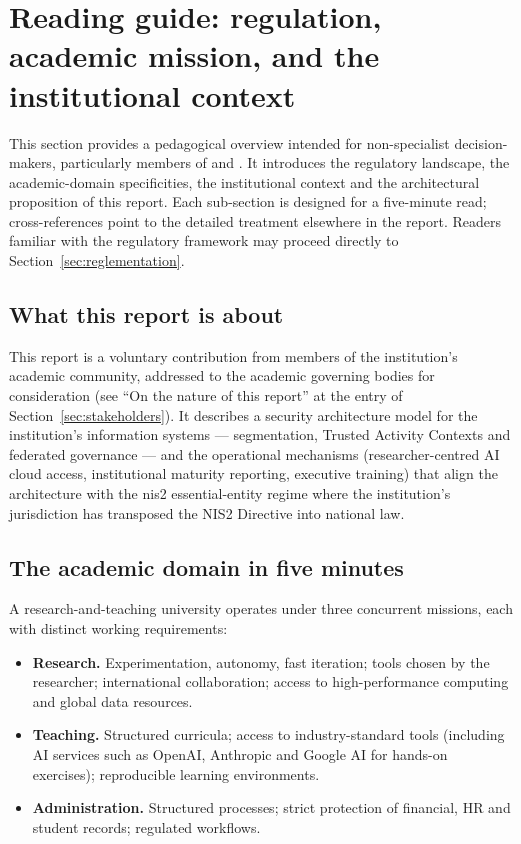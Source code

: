 \section{Reading guide: regulation, academic mission, and the institutional context}
\label{sec:reading-guide}

This section provides a pedagogical overview intended for
non-specialist decision-makers, particularly members of  and
. It introduces the regulatory
landscape, the academic-domain specificities, the institutional
context and the architectural proposition of this report. Each
sub-section is designed for a five-minute read; cross-references
point to the detailed treatment elsewhere in the report. Readers
familiar with the regulatory framework may proceed directly to
Section~\ref{sec:reglementation}.

\subsection{What this report is about}

This report is a voluntary contribution from members of the
institution's academic community, addressed to
the academic governing bodies for consideration (see ``On the nature of
this report'' at the entry of
Section~\ref{sec:stakeholders}). It describes a security
architecture model for the institution's information systems
--- segmentation, Trusted Activity Contexts and federated
governance --- and the operational mechanisms (researcher-centred
AI cloud access, institutional maturity reporting, executive
training) that align the architecture with the \gls{nis2}
essential-entity regime where the institution's jurisdiction has
transposed the NIS2 Directive into national law.

\subsection{The academic domain in five minutes}

A research-and-teaching university operates under three concurrent
missions, each with distinct working requirements:

\begin{itemize}[nosep]
    \item \textbf{Research.} Experimentation, autonomy, fast
    iteration; tools chosen by the researcher; international
    collaboration; access to high-performance computing and global
    data resources.
    \item \textbf{Teaching.} Structured curricula; access to
    industry-standard tools (including AI services such as
    OpenAI, Anthropic and Google AI for hands-on exercises);
    reproducible learning environments.
    \item \textbf{Administration.} Structured processes; strict
    protection of financial, HR and student records;
    regulated workflows.
\end{itemize}

